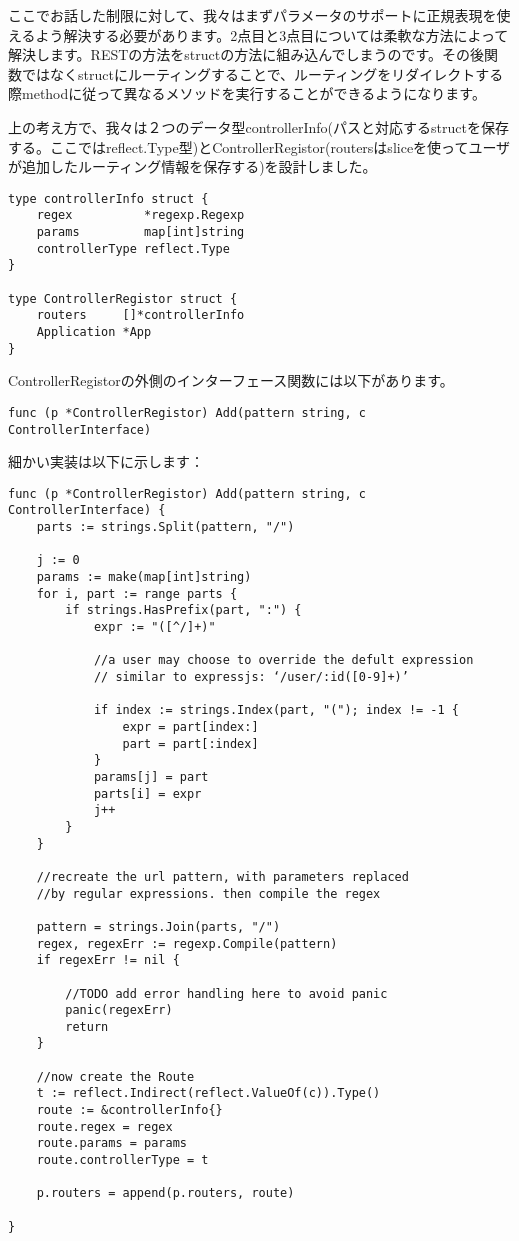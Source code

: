ここでお話した制限に対して、我々はまずパラメータのサポートに正規表現を使えるよう解決する必要があります。2点目と3点目については柔軟な方法によって解決します。RESTの方法をstructの方法に組み込んでしまうのです。その後関数ではなくstructにルーティングすることで、ルーティングをリダイレクトする際methodに従って異なるメソッドを実行することができるようになります。

上の考え方で、我々は２つのデータ型controllerInfo(パスと対応するstructを保存する。ここではreflect.Type型)とControllerRegistor(routersはsliceを使ってユーザが追加したルーティング情報を保存する)を設計しました。

\begin{lstlisting}[numbers=none]
type controllerInfo struct {
    regex          *regexp.Regexp
    params         map[int]string
    controllerType reflect.Type
}

type ControllerRegistor struct {
    routers     []*controllerInfo
    Application *App
}
\end{lstlisting}

ControllerRegistorの外側のインターフェース関数には以下があります。



\begin{lstlisting}[numbers=none]
func (p *ControllerRegistor) Add(pattern string, c ControllerInterface)
\end{lstlisting}

細かい実装は以下に示します：



\begin{lstlisting}[numbers=none]
func (p *ControllerRegistor) Add(pattern string, c ControllerInterface) {
    parts := strings.Split(pattern, "/")

    j := 0
    params := make(map[int]string)
    for i, part := range parts {
        if strings.HasPrefix(part, ":") {
            expr := "([^/]+)"

            //a user may choose to override the defult expression
            // similar to expressjs: ‘/user/:id([0-9]+)’

            if index := strings.Index(part, "("); index != -1 {
                expr = part[index:]
                part = part[:index]
            }
            params[j] = part
            parts[i] = expr
            j++
        }
    }

    //recreate the url pattern, with parameters replaced
    //by regular expressions. then compile the regex

    pattern = strings.Join(parts, "/")
    regex, regexErr := regexp.Compile(pattern)
    if regexErr != nil {

        //TODO add error handling here to avoid panic
        panic(regexErr)
        return
    }

    //now create the Route
    t := reflect.Indirect(reflect.ValueOf(c)).Type()
    route := &controllerInfo{}
    route.regex = regex
    route.params = params
    route.controllerType = t

    p.routers = append(p.routers, route)

}
\end{lstlisting}




